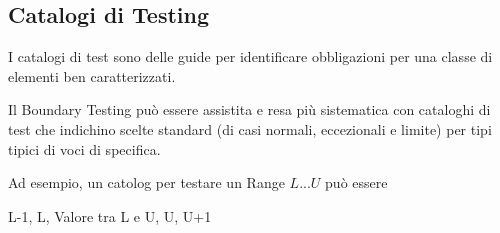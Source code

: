 \subsection*{Catalogi di Testing}
I catalogi di test sono delle guide per identificare obbligazioni per una classe di elementi ben caratterizzati.

Il Boundary Testing può essere assistita e resa più sistematica con cataloghi di test che indichino scelte standard (di casi normali, eccezionali e limite) per tipi tipici di voci di specifica.

Ad esempio, un catolog per testare un Range $L ... U$ può essere
\begin{center}
    L-1, L, Valore tra L e U, U, U+1
\end{center}

